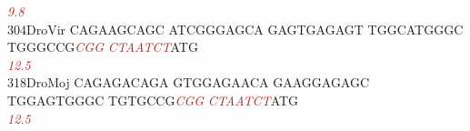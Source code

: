 \documentclass[11pt,twoside,reqno,a4paper]{article}
\begin{document}
{\hspace*{4\charwidth}\hspace*{7\charwidth}\hspace*{1\charwidth}\hspace*{1\charwidth}\hspace*{1\charwidth}\hspace*{1\charwidth}\hspace*{47\charwidth}\textit{\textcolor{brown}{9.8}}\hspace*{1\charwidth}\hspace*{1\charwidth}\\
304\hspace*{1\charwidth}DroVir	CAGAAGCAGC	ATCGGGAGCA	GAGTGAGAGT	TGGCATGGGC	TGGGCCG\textit{\textcolor{brown}{C}}\textit{\textcolor{brown}{G}}\textit{\textcolor{brown}{G}}	\textit{\textcolor{brown}{C}}\textit{\textcolor{brown}{T}}\textit{\textcolor{brown}{A}}\textit{\textcolor{brown}{A}}\textit{\textcolor{brown}{T}}\textit{\textcolor{brown}{C}}\textit{\textcolor{brown}{T}}ATG	\\
\hspace*{4\charwidth}\hspace*{7\charwidth}\hspace*{1\charwidth}\hspace*{1\charwidth}\hspace*{1\charwidth}\hspace*{1\charwidth}\hspace*{47\charwidth}\textit{\textcolor{brown}{12.5}}\hspace*{1\charwidth}\hspace*{1\charwidth}\\
318\hspace*{1\charwidth}DroMoj	CAGAGACAGA	GTGGAGAACA	GAAGGAGAGC	TGGAGTGGGC	TGTGCCG\textit{\textcolor{brown}{C}}\textit{\textcolor{brown}{G}}\textit{\textcolor{brown}{G}}	\textit{\textcolor{brown}{C}}\textit{\textcolor{brown}{T}}\textit{\textcolor{brown}{A}}\textit{\textcolor{brown}{A}}\textit{\textcolor{brown}{T}}\textit{\textcolor{brown}{C}}\textit{\textcolor{brown}{T}}ATG	\\
\hspace*{4\charwidth}\hspace*{7\charwidth}\hspace*{1\charwidth}\hspace*{1\charwidth}\hspace*{1\charwidth}\hspace*{1\charwidth}\hspace*{47\charwidth}\textit{\textcolor{brown}{12.5}}\hspace*{1\charwidth}\hspace*{1\charwidth}\\
}
\end{document}

